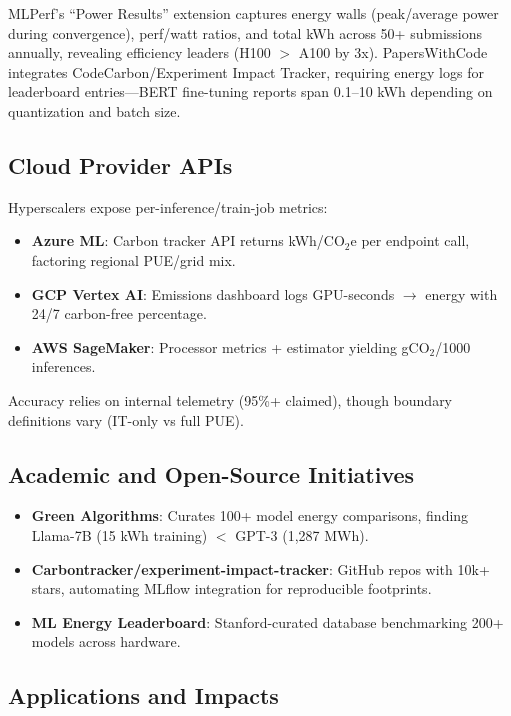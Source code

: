 MLPerf's ``Power Results'' extension captures energy walls (peak/average power during convergence), perf/watt ratios, and total kWh across 50+ submissions annually, revealing efficiency leaders (H100 $>$ A100 by 3x). PapersWithCode integrates CodeCarbon/Experiment Impact Tracker, requiring energy logs for leaderboard entries—BERT fine-tuning reports span 0.1--10 kWh depending on quantization and batch size.

\subsection{Cloud Provider APIs}

Hyperscalers expose per-inference/train-job metrics:
\begin{itemize}
    \item \textbf{Azure ML}: Carbon tracker API returns kWh/CO$_2$e per endpoint call, factoring regional PUE/grid mix.
    \item \textbf{GCP Vertex AI}: Emissions dashboard logs GPU-seconds $\to$ energy with 24/7 carbon-free percentage.
    \item \textbf{AWS SageMaker}: Processor metrics + estimator yielding gCO$_2$/1000 inferences.
\end{itemize}

Accuracy relies on internal telemetry (95\%+ claimed), though boundary definitions vary (IT-only vs full PUE).

\subsection{Academic and Open-Source Initiatives}

\begin{itemize}
    \item \textbf{Green Algorithms}: Curates 100+ model energy comparisons, finding Llama-7B (15 kWh training) $<$ GPT-3 (1,287 MWh).
    \item \textbf{Carbontracker/experiment-impact-tracker}: GitHub repos with 10k+ stars, automating MLflow integration for reproducible footprints.
    \item \textbf{ML Energy Leaderboard}: Stanford-curated database benchmarking 200+ models across hardware.
\end{itemize}

\subsection{Applications and Impacts}

